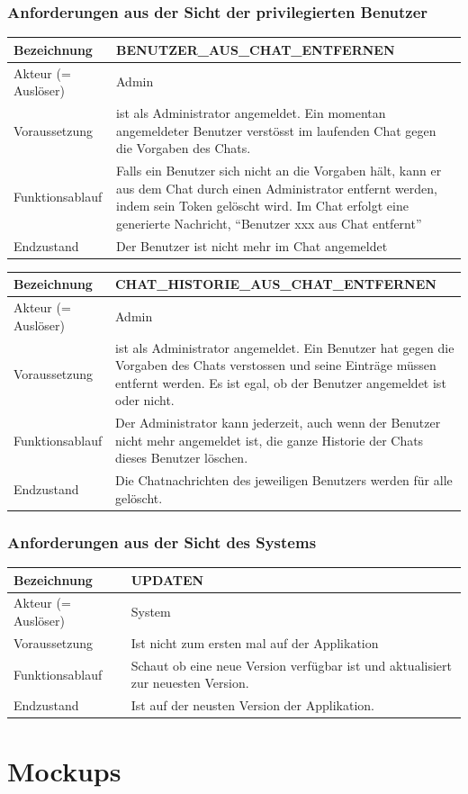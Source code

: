 \documentclass[12pt]{article}
\newcommand{\requirementTable}[5]{
    \begin{table}[H]
      \begin{tabularx}{\textwidth}{|l|X|}
        \hline
        Bezeichnung & #1  \\ \hline
        Akteur (= Auslöser) & #2  \\ \hline
        Voraussetzung & #3  \\ \hline
        Funktionsablauf & #4  \\ \hline
        Endzustand & #5  \\ \hline
      \end{tabularx}
    \end{table}
}
\begin{document}
      \subsubsection{Anforderungen aus der Sicht der privilegierten Benutzer}
        \requirementTable
            {BENUTZER\_AUS\_CHAT\_ENTFERNEN}
            {Admin}
            {
            ist als Administrator angemeldet. \newline
            Ein momentan angemeldeter Benutzer verstösst im laufenden Chat gegen die Vorgaben des Chats.
            }
            {
            Falls ein Benutzer sich nicht an die Vorgaben hält, kann er aus dem Chat durch einen Administrator entfernt werden, indem sein Token gelöscht wird. \newline
            Im Chat erfolgt eine generierte Nachricht, “Benutzer xxx aus Chat entfernt”
            }
            {Der Benutzer ist nicht mehr im Chat angemeldet}


        \requirementTable
            {CHAT\_HISTORIE\_AUS\_CHAT\_ENTFERNEN}
            {Admin}
            {
            ist als Administrator angemeldet. \newline
            Ein  Benutzer hat gegen die Vorgaben des Chats verstossen und seine Einträge müssen entfernt werden. Es ist egal, ob der Benutzer angemeldet ist oder nicht.
            }
            {
            Der Administrator kann jederzeit, auch wenn der Benutzer nicht mehr angemeldet ist, die ganze Historie der Chats dieses Benutzer löschen.
            }
            {
            Die Chatnachrichten des jeweiligen Benutzers werden für alle gelöscht.
            }

      \subsubsection{Anforderungen aus der Sicht des Systems}
         \requirementTable
            {UPDATEN}
            {System}
            {Ist nicht zum ersten mal auf der Applikation}
            {Schaut ob eine neue Version verfügbar ist und aktualisiert zur neuesten Version.}
            {Ist auf der neusten Version der Applikation.}

    \section{Mockups}
\end{document}
